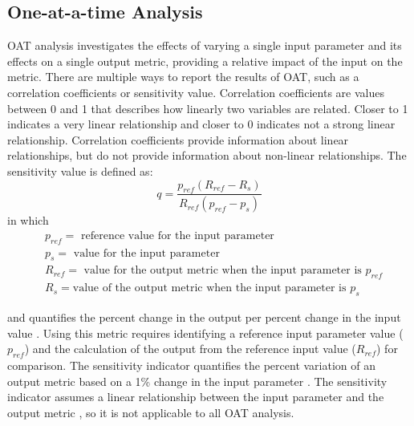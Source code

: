 \subsection{One-at-a-time Analysis}\label{sec:oat_background}
\gls{OAT} analysis 
investigates the effects of varying a single input parameter and its effects
on a single output metric, providing a relative impact of the input on the 
metric. There are multiple ways to report the results of \gls{OAT}, such as a 
correlation coefficients or sensitivity value. Correlation coefficients 
are values between 0 and 1 that describes how linearly two variables 
are related. Closer to 1 indicates a very linear relationship and closer to 
0 indicates not a strong linear relationship. Correlation coefficients 
provide information about linear relationships, but do not provide 
information about non-linear relationships. 
The sensitivity value is defined as:
\begin{equation}
    q = \frac{p_{ref}(R_{ref}-R_s)}{R_{ref}(p_{ref}-p_s)}
    \label{eq:sensitivity_metric}
\end{equation}
in which 
\begin{align*}
    &p_{ref} = \text{ reference value for the input parameter}\\
    &p_s = \text{ value for the input parameter}\\
    &R_{ref} = \text{ value for the output metric when the input parameter is }p_{ref}\\
    &R_s = \text{value of the output metric when the input parameter is }p_s
\end{align*}

\noindent and quantifies the percent change in the output 
per percent change in the input value \cite{noauthor_effects_2017}. 
Using this metric requires identifying a reference input parameter value 
($p_{ref}$) and the calculation of the output from the reference input value 
($R_{ref}$) for comparison. The sensitivity indicator  
quantifies the percent variation of an output metric based on a 1\% change in 
the input parameter \cite{noauthor_effects_2017}. The sensitivity indicator 
assumes a linear relationship between the input parameter and the output metric 
\cite{noauthor_effects_2017}, so it is not applicable to all \gls{OAT} 
analysis. 

